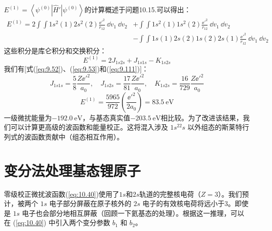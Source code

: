     $E^{\left(1\right)} = \left\langle \psi^{\left(0\right)} \left| \hat{H}' \right| \psi^{\left(0\right)} \right\rangle$的计算概述于问题10.15.可以得出：
    \begin{equation}
        \begin{aligned}
            E^{\left(1\right)} = 2\int \int 1s^2\left(1\right)2s^2\left(2\right) \frac{\ee '^2}{r_{12}} \: \dd v_1 \: \dd v_2 &+ \int \int 1s^2\left(1\right)1s^2\left(2\right) \frac{\ee '^2}{r_{12}} \: \dd v_1 \: \dd v_2 \\
            &- \int \int 1s\left(1\right)2s\left(2\right)1s\left(2\right)2s\left(1\right) \frac{\ee '^2}{r_{12}} \: \dd v_1 \: \dd v_2
        \end{aligned}
        \label{eq:10.50}
    \end{equation}
    这些积分是库仑积分和交换积分：
    \begin{equation}
        E^{\left(1\right)} = 2J_{1s2s} + J_{1s1s} - K_{1s2s}
        \label{eq:10.51}
    \end{equation}
    我们有[式(\ref{eq:9.52})、(\ref{eq:9.53})和(\ref{eq:9.111})]：
    \begin{equation*}
        J_{1s1s} = \frac{5}{8} \frac{Z\ee '^2}{a_0}, \quad J_{1s2s} = \frac{17}{81} \frac{Z\ee '^2}{a_0}, \quad K_{1s2s} = \frac{16}{729} \frac{Z\ee '^2}{a_0}
    \end{equation*}
    \begin{equation*}
        E^{\left(1\right)} = \frac{5965}{972}\left(\frac{\ee '^2}{2a_0}\right) = 83.5 \: \mathrm{eV}
    \end{equation*}
    一级微扰能量为$-192.0 \: \mathrm{eV}$，与基态真实值$-203.5 \: \mathrm{eV}$相比较。为了改进该结果，我们可以计算更高级的波函数和能量校正。这将混入涉及 $1s^22s$ 以外组态的斯莱特行列式的波函数贡献中（组态相互作用）。

\section{变分法处理基态锂原子}
\label{sec:10.8 Variation Treatments of the Lithium Ground State}

    零级校正微扰波函数(\ref{eq:10.40})使用了$1s$和$2s$轨道的完整核电荷（$Z=3$）。我们预计，被两个 $1s$ 电子部分屏蔽在原子核外的 $2s$ 电子的有效核电荷将远小于3。即使是 $1s$ 电子也会部分地相互屏蔽（回顾一下氦基态的处理）。根据这一推理，可以在 (\ref{eq:10.40}) 中引入两个变分参数 $b_1$ 和 $b_2$。

